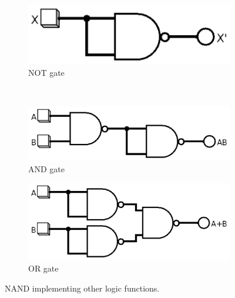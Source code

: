 \documentclass{article}
\begin{document}
\begin{figure}[hbtp]
  \centering
  \begin{subfigure}[b]{0.4\textwidth}
    \includegraphics[width=\textwidth]{nand_invert}
    \caption{\label{fig:nand-invert} NOT gate}
  \end{subfigure}%
  ~
  \begin{subfigure}[t]{0.5\textwidth}
    \includegraphics[width=\textwidth]{nand_and}
    \caption{\label{fig:nand_and} AND gate}
  \end{subfigure}
  \begin{subfigure}[b]{0.5\textwidth}
    \includegraphics[width=\textwidth]{nand_or}
    \caption{\label{fig:nand_or} OR gate}
    \end{subfigure}
  \caption{\label{fig:nand_gates} NAND implementing other logic functions.}
\end{figure}
\end{document}
